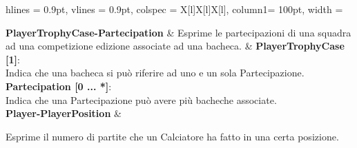\begin{tblr}{
    hlines = {0.9pt}, vlines = {0.9pt}, colspec = {X[l]X[l]X[l]}, column{1}= {100pt},
    width = \textwidth
}

	{
		\textbf{PlayerTrophyCase-Partecipation}
	}
	&
	{
		Esprime le partecipazioni di una squadra
		ad una competizione edizione associate
		ad una bacheca.
	}
	&
	{
		\textbf{PlayerTrophyCase [1]}:\\Indica che una bacheca
			si può riferire ad uno e un sola Partecipazione.\\
		\medskip\textbf{Partecipation [0 ... *]}:\\Indica che
			una Partecipazione può avere più bacheche associate.
	}
	\\
	{
		\textbf{Player-PlayerPosition}
	}
	&
	{
		Esprime il numero di partite che un Calciatore
		ha fatto in una certa posizione.
		
}
\end{tblr}
